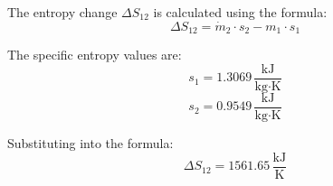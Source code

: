 The entropy change \( \Delta S_{12} \) is calculated using the formula:  
\[
\Delta S_{12} = \dot{m}_2 \cdot s_2 - m_1 \cdot s_1
\]  

The specific entropy values are:  
\[
s_1 = 1.3069 \, \frac{\text{kJ}}{\text{kg·K}}
\]  
\[
s_2 = 0.9549 \, \frac{\text{kJ}}{\text{kg·K}}
\]  

Substituting into the formula:  
\[
\Delta S_{12} = 1561.65 \, \frac{\text{kJ}}{\text{K}}
\]